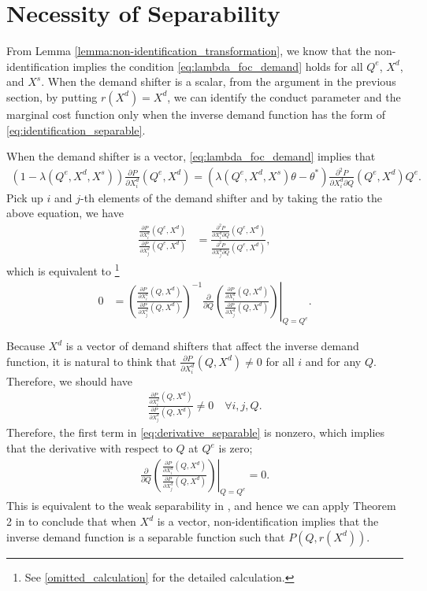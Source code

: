 \documentclass[11pt, a4paper]{article}
\theoremstyle{remark}
\begin{document}
\section{Necessity of Separability}

From Lemma \ref{lemma:non-identification_transformation}, we know that the non-identification implies the condition \eqref{eq:lambda_foc_demand} holds for all $Q^e$, $X^{d}$, and $X^{s}$.
When the demand shifter is a scalar, from the argument in the previous section, by putting $r(X^{d}) = X^{d}$, we can identify the conduct parameter and the marginal cost function only when the inverse demand function has the form of \eqref{eq:identification_separable}.

When the demand shifter is a vector, \eqref{eq:lambda_foc_demand} implies that
\begin{align}
    (1 - \lambda(Q^e, X^{d}, X^{s}))\frac{\partial P}{\partial X^{d}_i}(Q^e, X^{d}) = (\lambda(Q^e, X^{d}, X^{s})\theta -  \theta^{*})\frac{\partial^2 P}{\partial X^{d}_i\partial Q}(Q^e, X^{d})Q^e.
\end{align}
Pick up $i$ and $j$-th elements of the demand shifter and by taking the ratio the above equation, we have
\begin{align}
    \frac{\frac{\partial P}{\partial X^{d}_{i}}(Q^e, X^{d})}{\frac{\partial P}{\partial X^{d}_{j}}(Q^e, X^{d})} & = \frac{ \frac{\partial^2 P}{\partial X^{d}_{i} \partial Q}(Q^e, X^{d})}{\frac{\partial^2 P}{\partial X^{d}_{j} \partial Q}(Q^e, X^{d})},
\end{align}
which is equivalent to \footnote{See \ref{omitted_calculation} for the detailed calculation.}
\begin{align}
    0 & = \left. \left(\frac{\frac{\partial P}{\partial X^{d}_{i}}(Q, X^{d})}{\frac{\partial P}{\partial X^{d}_{j}}(Q, X^{d})}\right)^{-1} \frac{\partial}{\partial Q} \left(\frac{\frac{\partial P}{\partial X^{d}_{i}}(Q, X^{d})}{\frac{\partial P}{\partial X^{d}_{j}}(Q, X^{d})}\right) \right|_{Q = Q^e}.
    \label{eq:derivative_separable}
\end{align}

Because $X^{d}$ is a vector of demand shifters that affect the inverse demand function, it is natural to think that $\frac{\partial P}{\partial X^{d}_{i}}(Q, X^{d}) \ne 0$ for all $i$ and for any $Q$.
Therefore, we should have
\begin{align}
    \frac{\frac{\partial P}{\partial X^{d}_{i}}(Q, X^{d})}{\frac{\partial P}{\partial X^{d}_{j}}(Q, X^{d})} \ne 0 \quad \forall i, j, Q.
\end{align}
Therefore, the first term in \eqref{eq:derivative_separable} is nonzero, which implies that the derivative with respect to $Q$ at $Q^e$ is zero;
\begin{align}
    \left. \frac{\partial}{\partial Q} \left(\frac{\frac{\partial P}{\partial X^{d}_{i}}(Q, X^{d})}{\frac{\partial P}{\partial X^{d}_{j}}(Q, X^{d})}\right) \right|_{Q = Q^e} = 0.
\end{align}
This is equivalent to the weak separability in \citet{goldmanNote1964}, and hence we can apply Theorem 2 in \citet{goldmanNote1964} to conclude that when $X^{d}$ is a vector, non-identification implies that the inverse demand function is a separable function such that $P(Q, r(X^{d}))$.
\end{document}
